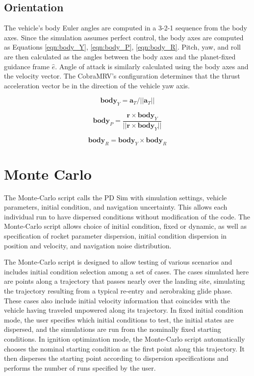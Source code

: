 \subsection{Orientation}
The vehicle's body Euler angles are computed in a 3-2-1 sequence from the body axes. Since the simulation assumes perfect control, the body axes are computed as Equations \ref{eqn:body_Y}, \ref{eqn:body_P}, \ref{eqn:body_R}. Pitch, yaw, and roll are then calculated as the angles between the body axes and the planet-fixed guidance frame $\hat{e}$. Angle of attack is similarly calculated using the body axes and the velocity vector. The CobraMRV's configuration determines that the thrust acceleration vector be in the direction of the vehicle yaw axis.

\begin{equation}
\label{eqn:body_Y}
\bm{body}_Y = \bm{a}_T/||\bm{a}_T||
\end{equation}

\begin{equation}
\label{eqn:body_P}
\bm{body}_P = \frac{\bm{r} \times \bm{body}_Y}{||\bm{r} \times \bm{body}_Y||}
\end{equation}

\begin{equation}
\label{eqn:body_R}
\bm{body}_R = \bm{body}_Y \times \bm{body}_R
\end{equation}

\section{Monte Carlo}
The Monte-Carlo script calls the PD Sim with simulation settings, vehicle parameters, initial condition, and navigation uncertainty. This allows each individual run to have dispersed conditions without modification of the code. The Monte-Carlo script allows choice of initial condition, fixed or dynamic, as well as specification of rocket parameter dispersion, initial condition dispersion in position and velocity, and navigation noise distribution.

The Monte-Carlo script is designed to allow testing of various scenarios and includes initial condition selection among a set of cases. The cases simulated here are points along a trajectory that passes nearly over the landing site, simulating the trajectory resulting from a typical re-entry and aerobraking glide phase. These cases also include initial velocity information that coincides with the vehicle having traveled unpowered along its trajectory. In fixed initial condition mode, the user specifies which initial conditions to test, the initial states are dispersed, and the simulations are run from the nominally fixed starting conditions. In ignition optimization mode, the Monte-Carlo script automatically chooses the nominal starting condition as the first point along this trajectory. It then disperses the starting point according to dispersion specifications and performs the number of runs specified by the user.

